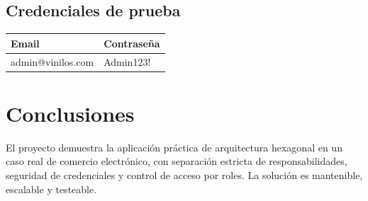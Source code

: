 \documentclass[11pt,letterpaper]{article}
\begin{document}
\subsection{Credenciales de prueba}

\begin{center}
\begin{tabular}{|l|l|}
\hline
\textbf{Email} & \textbf{Contraseña} \\
\hline
admin@vinilos.com & Admin123! \\
\hline
\end{tabular}
\end{center}

\section{Conclusiones}

El proyecto demuestra la aplicación práctica de arquitectura hexagonal en un caso real de comercio electrónico, con separación estricta de responsabilidades, seguridad de credenciales y control de acceso por roles. La solución es mantenible, escalable y testeable.
\end{document}
